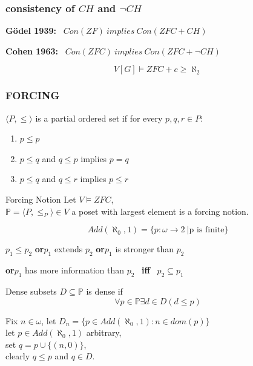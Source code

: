 \documentclass{beamer}
\begin{document}
\begin{frame}
\frametitle{consistency of $CH$ and $\neg CH$}
\begin{center}
\textbf{G\"{o}del 1939:} \ $Con(ZF) \ implies \ Con(ZFC + CH)$
\end{center}
\vspace{5mm}

\begin{center}
\textbf{Cohen 1963:} \ $Con(ZFC) \ implies \ Con(ZFC + \neg CH)$
\end{center}

\pause
\begin{center}
$$V[G] \models ZFC + c \geq \aleph_2$$
\end{center}
\end{frame}
\begin{frame}
\frametitle{FORCING}
\begin{definition}
$\langle P, \leq \rangle$ is a partial ordered set if for every $p, q, r \in P$:
\begin{enumerate}
\item $p \leq p$
\item $p \leq q$ and $q \leq p$ implies $p=q$
\item $p \leq q$ and $q \leq r$ implies $p \leq r$
\end{enumerate}
\end{definition}
\pause
\begin{block}{Forcing Notion}
Let $V \models ZFC$,\\
$\mathbb{P}= \langle P, \leq_P \rangle \in V$ a poset with largest element is a forcing notion.

$$Add(\aleph_0, 1)= \{p \colon \omega \longrightarrow 2 \ | \text{p is finite}\}$$
\end{block}
$p_1 \leq p_2$ \quad \textbf{{\large or}}\quad $p_1$ extends $p_2$ \quad \textbf{{\large or}}\quad $p_1$ is stronger than $p_2$

\textbf{{\large or}}\quad $p_1$ has more information than $p_2$ \ \textbf{{\large iff}} \ $p_2 \subseteq p_1$

\end{frame}
\begin{frame}
\vspace{-2mm}
\begin{block}{Dense subsets}
$D \subseteq \mathbb{P}$ is dense if
 $$\forall p \in \mathbb{P} \exists d \in D (d \leq p)$$
\end{block}
Fix $n \in \omega$, let $D_n=\{p \in Add(\aleph_0, 1) \colon n \in dom(p)\}$\\
\pause
let $p \in Add(\aleph_0, 1)$ arbitrary,\\
\pause
set $q= p \cup \{(n, 0)\}$,\\
\pause
clearly $q \leq p$ and $q \in D$.
\end{frame}
\end{document}

